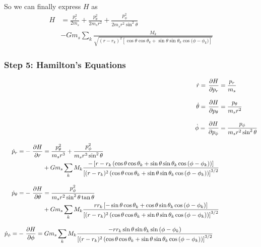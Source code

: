 So we can finally express \(H\) as
\begin{equation}
    \begin{aligned}
        H &= \frac{p_r^2}{2 m_s} + \frac{p_\theta^2}{2 m_s r^2} + \frac{p_\phi^2}{2 m_s r^2 \sin^2{\theta}} \\
        &- G m_s \sum\limits_{k} \frac{M_k}{\sqrt{(r - r_k)^2\left[\cos{\theta}\cos{\theta_k}+\sin{\theta}\sin{\theta_k}\cos{(\phi - \phi_k})\right]}}
    \end{aligned}
\end{equation}

\subsubsection{Step 5: Hamilton's Equations}
\begin{align}
    \dot{r} = \operatorname{}\frac{\partial H}{\partial p_r} &= \frac{p_r}{m_s} \label{eq:rdot} \\[0.3cm]
    \dot{\theta} = \operatorname{}\frac{\partial H}{\partial p_\theta} &= \frac{p_\theta}{m_s r^2} \label{eq:thetadot} \\[0.3cm]
    \dot{\phi} = \operatorname{}\frac{\partial H}{\partial p_\phi} &= \frac{p_\phi}{m_s r^2 \sin^2{\theta}} \label{eq:phidot}  \\[0.3cm]
    \begin{split}
        \dot{p}_r = -\operatorname{}\frac{\partial H}{\partial r} &= \frac{p_\theta^2}{m_s r^3} + \frac{p_\phi^2}{m_s r^3 \sin^2{\theta} } \\
        &+ G m_s \sum\limits_{k} M_k \frac{-\left[r - r_k \left(\cos{\theta}\cos{\theta_k} + \sin{\theta}\sin{\theta_k}\cos{(\phi - \phi_k)}\right) \right]}{\left[(r - r_k)^2 \left(\cos{\theta}\cos{\theta_k} + \sin{\theta}\sin{\theta_k}\cos{(\phi - \phi_k)} \right) \right]^{3/2}} \label{eq:prdot}
    \end{split} \\[0.3cm]
    \begin{split}
        \dot{p}_\theta = -\operatorname{}\frac{\partial H}{\partial \theta} &= \frac{p_\phi^2}{m_s r^2 \sin^2{\theta} \tan{\theta}} \\
        &+ G m_s \sum\limits_{k} M_k \frac{r r_k \left[-\sin{\theta}\cos{\theta_k} + \cos{\theta}\sin{\theta_k}\cos{(\phi - \phi_k)} \right]}{\left[(r - r_k)^2 \left(\cos{\theta}\cos{\theta_k} + \sin{\theta}\sin{\theta_k}\cos{(\phi - \phi_k)} \right) \right]^{3/2}} \label{eq:pthetadot}
    \end{split} \\[0.3cm]
    \begin{split}
        \dot{p}_\phi = -\operatorname{}\frac{\partial H}{\partial \phi} &= G m_s \sum\limits_{k} M_k \frac{- r r_k \sin{\theta}\sin{\theta_k}\sin{(\phi - \phi_k)}}{\left[(r - r_k)^2 \left(\cos{\theta}\cos{\theta_k} + \sin{\theta}\sin{\theta_k}\cos{(\phi - \phi_k)} \right) \right]^{3/2}} \label{eq:pphidot}
    \end{split}
\end{align}

